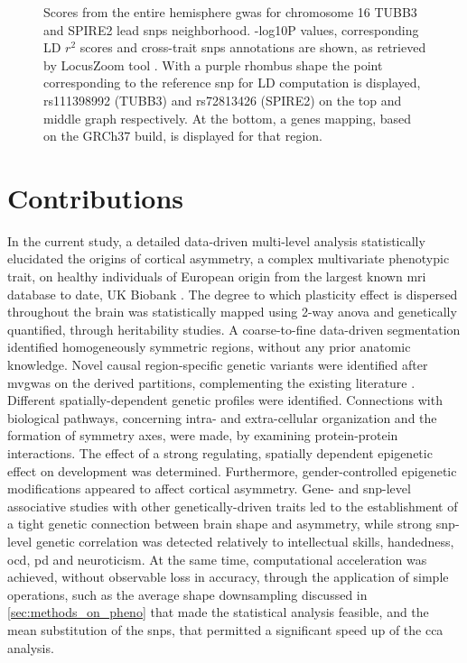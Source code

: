 \begin{figure}[H]
	\begin{adjustwidth}{-3cm}{-2.5cm}
		\centering
		\par\medskip
	\end{adjustwidth}
		\caption[Entire hemisphere \ac{gwas} Manhattan plot chromosome 16 peaks  in detail]{Scores from the entire hemisphere \ac{gwas} for chromosome 16 TUBB3 and SPIRE2 lead \acp{snp} neighborhood. -log10P values, corresponding LD $r^2$ scores and cross-trait \acp{snp} annotations are shown, as retrieved by LocusZoom tool \cite{Boughton2021}. With a purple rhombus shape the point corresponding to the reference \ac{snp} for LD computation is displayed, rs111398992 (TUBB3) and rs72813426 (SPIRE2) on the top and middle graph respectively. At the bottom, a genes mapping, based on the GRCh37 build, is displayed for that region.}
		\label{fig:chr16}
\end{figure}


\section{Contributions}
In the current study, a detailed  data-driven multi-level analysis statistically elucidated the origins of cortical asymmetry, a complex multivariate phenotypic trait, on healthy individuals of European origin from the largest known \ac{mri} database to date, UK Biobank \cite{Littlejohns2020}. The degree to which plasticity effect is dispersed throughout the brain was statistically mapped using 2-way \ac{anova} and genetically quantified, through heritability studies. A coarse-to-fine data-driven segmentation identified homogeneously symmetric regions, without any prior anatomic knowledge.  Novel causal region-specific genetic variants were identified after \ac{mvgwas} on the derived partitions, complementing the existing literature \cite{Sha2021}. Different spatially-dependent genetic profiles were identified. Connections with biological pathways, concerning intra- and extra-cellular organization and the formation of symmetry axes, were made, by examining protein-protein interactions. The effect of a strong regulating, spatially dependent epigenetic effect on development was determined. Furthermore, gender-controlled epigenetic modifications appeared to affect cortical asymmetry. Gene- and \ac{snp}-level associative studies  with other genetically-driven traits led to the establishment of a tight genetic connection between  brain shape and asymmetry, while strong \ac{snp}-level genetic correlation was detected relatively to intellectual skills, handedness, \ac{ocd}, \ac{pd} and neuroticism. At the same time, computational acceleration was achieved, without observable loss in accuracy, through the application of simple operations, such as the average shape downsampling discussed in \autoref{sec:methods_on_pheno} that made the statistical analysis feasible, and the mean substitution of the \acp{snp}, that permitted a significant speed up of the \ac{cca} analysis.

